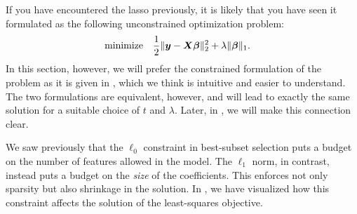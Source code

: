 If you have encountered the lasso previously, it is likely that you have seen it formulated as the following unconstrained optimization problem:
\[
  \begin{aligned}
     & \text{minimize} &  & \frac{1}{2} \lVert \boldsymbol{y} - \boldsymbol{X}\boldsymbol{\beta}\rVert^2_2 + \lambda \lVert \boldsymbol{\beta}\rVert_1.
  \end{aligned}
\]
In this section, however, we will prefer the constrained formulation of the problem as it is given in , which we think is intuitive and easier to understand. The two formulations are equivalent, however, and will lead to exactly the same solution for a suitable choice of \(t\) and \(\lambda\). Later, in , we will make this connection clear.

We saw previously that the \(\ell_0\) constraint in best-subset selection puts a budget on the number of features allowed in the model. The \(\ell_1\) norm, in contrast, instead puts a budget on the \emph{size} of the coefficients. This enforces not only sparsity but also shrinkage in the solution. In , we have visualized how this constraint affects the solution of the least-squares objective.

